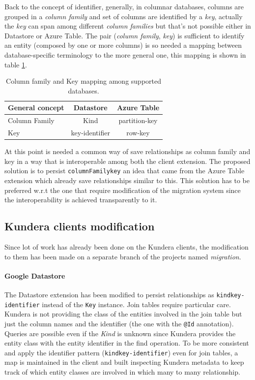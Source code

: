 \newparagraph Back to the concept of identifier, generally, in columnar databases, columns are grouped in a \textit{column family} and set of columns are identified by a \textit{key}, actually the \textit{key} can span among different \textit{column families} but that's not possible either in Datastore or Azure Table.
The pair (\textit{column family}, \textit{key}) is sufficient to identify an entity (composed by one or more columns) is so needed a mapping between database-specific terminology to the more general one, this mapping is shown in table \ref{table:mapping}.

\begin{table}[h]
\begin{center}
\renewcommand{\arraystretch}{1.4}
\begin{tabular}{lcc}
\hline
\textbf{General concept} & \textbf{Datastore} & \textbf{Azure Table}\\ 
\hline\hline
Column Family & Kind & partition-key \\
Key & key-identifier & row-key \\
\hline
\end{tabular}
\end{center}
\caption{Column family and Key mapping among supported databases.}
\label{table:mapping}
\end{table}

\noindent At this point is needed a common way of save relationships as column family and key in a way that is interoperable among both the client extension.
The proposed solution is to persist \texttt{columnFamily\textunderscore key} an idea that came from the Azure Table extension which already save relationships similar to this. This solution has to be preferred w.r.t the one that require modification of the migration system since the interoperability is achieved transparently to it.

\subsection{Kundera clients modification}
Since lot of work has already been done on the Kundera clients, the modification to them has been made on a separate branch of the projects named \textit{migration}.

\paragraph{Google Datastore} The Datastore extension has been modified to persist relationships as \texttt{kind\textunderscore key-identifier} instead of the \texttt{Key} instance.
Join tables require particular care. Kundera is not providing the class of the entities involved in the join table but just the column names and the identifier (the one with the \texttt{@Id} annotation). Queries are possible even if the \textit{Kind} is unknown since Kundera provides the entity class with the entity identifier in the find operation.
To be more consistent and apply the identifier pattern (\texttt{kind\textunderscore key-identifier}) even for join tables, a map is maintained in the client and built inspecting Kundera metadata to keep track of which entity classes are involved in which many to many relationship.

